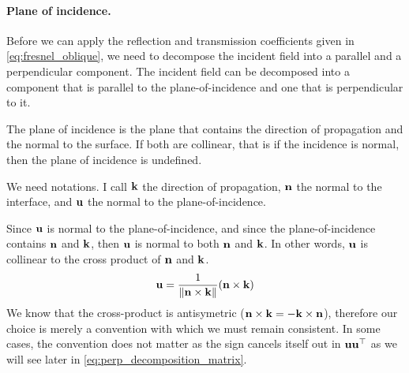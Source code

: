 \paragraph{Plane of incidence.}
Before we can apply the reflection and transmission coefficients given in \cref{eq:fresnel_oblique}, we need to decompose the incident field into a parallel and a perpendicular component.
The incident field can be decomposed into a component that is parallel to the plane-of-incidence and one that is perpendicular to it.

The plane of incidence is the plane that contains the direction of propagation and the normal to the surface.
If both are collinear, that is if the incidence is normal, then the plane of incidence is undefined.

We need notations.
I call $\mathbf{k}$ the direction of propagation, $\mathbf{n}$ the normal to the interface, and $\mathbf{u}$ the normal to the plane-of-incidence.

Since $\mathbf{u}$ is normal to the plane-of-incidence, and since the plane-of-incidence contains $\mathbf{n}$ and $\mathbf{k}$, then $\mathbf{u}$ is normal to both $\mathbf{n}$ and $\mathbf{k}$.
In other words, $\mathbf{u}$ is collinear to the cross product of $\mathbf{n}$ and $\mathbf{k}$.
\begin{equation}
    \mathbf{u} = \frac{1}{\left\| \mathbf{n} \times \mathbf{k} \right\|} (\mathbf{n} \times \mathbf{k})  \label{eq:normal_to_plane_of_incidence}
\end{equation}
We know that the cross-product is antisymetric
($\mathbf{n} \times \mathbf{k} = \mathord{-} \mathbf{k} \times \mathbf{n}$),
therefore our choice is merely a convention with which we must remain consistent.
In some cases, the convention does not matter as the sign cancels itself out in $\mathbf{u} \mathbf{u}^\top$ as we will see later in \cref{eq:perp_decomposition_matrix}.

